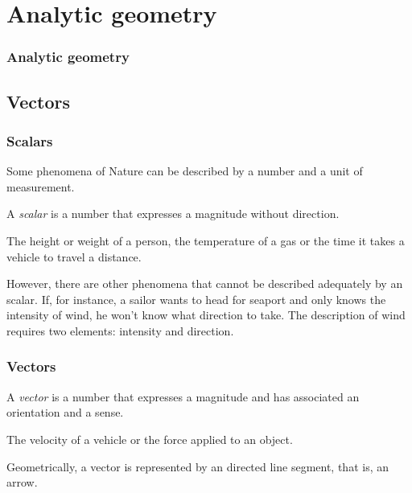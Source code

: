 \section{Analytic geometry}

\begin{frame}
\frametitle{Analytic geometry}
\setlength{\parskip}{0.3em}
\tableofcontents[sectionstyle=show/hide,hideothersubsections]
\end{frame}

\subsection{Vectors}

\begin{frame}
\frametitle{Scalars}
Some phenomena of Nature can be described by a number and a unit of measurement. 

\begin{definition}[Scalar]
A \emph{scalar} is a number that expresses a magnitude without direction.
\end{definition}
 The height or weight of a person, the temperature of a gas or the time it takes a vehicle to travel a distance.

However, there are other phenomena that cannot be described adequately by an scalar. 
If, for instance, a sailor wants to head for seaport and only knows the intensity of wind, he won't know what direction to take. The description of wind requires two elements: intensity and direction. 
\end{frame}


\begin{frame}
\frametitle{Vectors}
\begin{definition}[Vector]
A \emph{vector} is a number that expresses a magnitude and has associated an orientation and a sense.
\end{definition}

 The velocity of a vehicle or the force applied to an object. 

Geometrically, a vector is represented by an directed line segment, that is, an arrow. 
\begin{center}

\end{center}
\end{frame}


